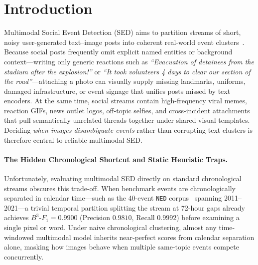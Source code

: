 \section{Introduction}
\label{sec:intro}

Multimodal Social Event Detection (SED) aims to partition streams of short, noisy user-generated text--image posts into coherent real-world event clusters~\cite{lin2024ned,han2026kqgnn,yang2026seinevent}. Because social posts frequently omit explicit named entities or background context---writing only generic reactions such as \emph{``Evacuation of detainees from the stadium after the explosion!''} or \emph{``It took volunteers 4 days to clear our section of the road''}---attaching a photo can visually supply missing landmarks, uniforms, damaged infrastructure, or event signage that unifies posts missed by text encoders. At the same time, social streams contain high-frequency viral memes, reaction GIFs, news outlet logos, off-topic selfies, and cross-incident attachments that pull semantically unrelated threads together under shared visual templates. Deciding \emph{when images disambiguate events} rather than corrupting text clusters is therefore central to reliable multimodal SED.

\paragraph{The Hidden Chronological Shortcut and Static Heuristic Traps.}
Unfortunately, evaluating multimodal SED directly on standard chronological streams obscures this trade-off. When benchmark events are chronologically separated in calendar time---such as the 40-event \texttt{NED} corpus~\cite{lin2024ned} spanning 2011--2021---a trivial temporal partition splitting the stream at 72-hour gaps already achieves $B^3\text{-}F_1 = 0.9900$ (Precision $0.9810$, Recall $0.9992$) before examining a single pixel or word. Under naive chronological clustering, almost any time-windowed multimodal model inherits near-perfect scores from calendar separation alone, masking how images behave when multiple same-topic events compete concurrently.

